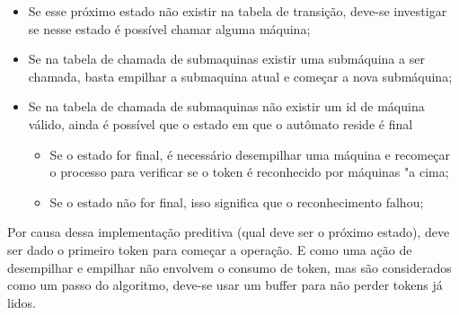 \begin{itemize}
  \item Se esse próximo estado não existir na tabela de transição, deve-se investigar se nesse estado é possível chamar alguma máquina;

  \item Se na tabela de chamada de submaquinas existir uma submáquina a ser chamada, basta empilhar a submaquina atual e começar a nova submáquina;

  \item Se na tabela de chamada de submaquinas não existir um id de máquina válido, ainda é possível que o estado em que o autômato reside é final
  \begin{itemize}
    \item Se o estado for final, é necessário desempilhar uma máquina e recomeçar o processo para verificar se o token é reconhecido por máquinas "a cima;
    \item Se o estado não for final, isso significa que o reconhecimento falhou;
    
  \end{itemize}

\end{itemize}

Por causa dessa implementação preditiva (qual deve ser o próximo estado), deve ser dado o primeiro token para começar a operação. E como uma ação de desempilhar e empilhar não envolvem o consumo de token, mas são considerados como um passo do algoritmo, deve-se usar um buffer para não perder tokens já lidos.
